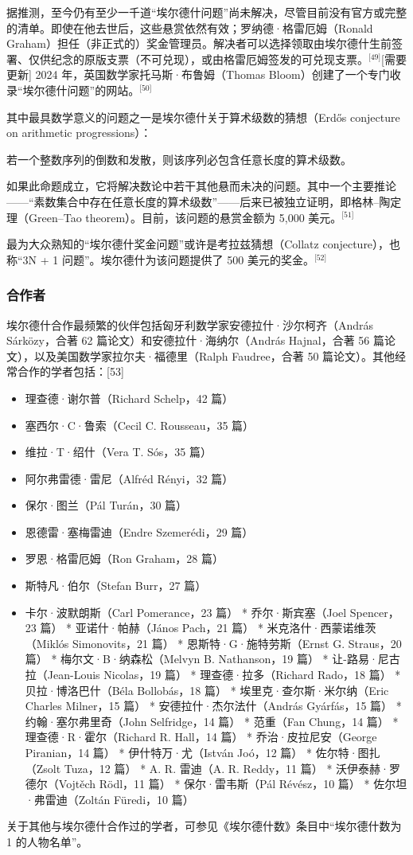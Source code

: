 据推测，至今仍有至少一千道“埃尔德什问题”尚未解决，尽管目前没有官方或完整的清单。即使在他去世后，这些悬赏依然有效；罗纳德·格雷厄姆（Ronald Graham）担任（非正式的）奖金管理员。解决者可以选择领取由埃尔德什生前签署、仅供纪念的原版支票（不可兑现），或由格雷厄姆签发的可兑现支票。\(^\text{[49]}\)[需要更新] 2024 年，英国数学家托马斯·布鲁姆（Thomas Bloom）创建了一个专门收录“埃尔德什问题”的网站。\(^\text{[50]}\)

其中最具数学意义的问题之一是埃尔德什关于算术级数的猜想（Erdős conjecture on arithmetic progressions）：

若一个整数序列的倒数和发散，则该序列必包含任意长度的算术级数。

如果此命题成立，它将解决数论中若干其他悬而未决的问题。其中一个主要推论——“素数集合中存在任意长度的算术级数”——后来已被独立证明，即格林–陶定理（Green–Tao theorem）。目前，该问题的悬赏金额为 5,000 美元。\(^\text{[51]}\)

最为大众熟知的“埃尔德什奖金问题”或许是考拉兹猜想（Collatz conjecture），也称“3N + 1 问题”。埃尔德什为该问题提供了 500 美元的奖金。\(^\text{[52]}\)
\subsubsection{合作者}
埃尔德什合作最频繁的伙伴包括匈牙利数学家安德拉什·沙尔柯齐（András Sárközy，合著 62 篇论文）和安德拉什·海纳尔（András Hajnal，合著 56 篇论文），以及美国数学家拉尔夫·福德里（Ralph Faudree，合著 50 篇论文）。其他经常合作的学者包括：[53]
\begin{itemize}
\item 理查德·谢尔普（Richard Schelp，42 篇）
\item 塞西尔·C·鲁索（Cecil C. Rousseau，35 篇）
\item 维拉·T·绍什（Vera T. Sós，35 篇）
\item 阿尔弗雷德·雷尼（Alfréd Rényi，32 篇）
\item 保尔·图兰（Pál Turán，30 篇）
\item 恩德雷·塞梅雷迪（Endre Szemerédi，29 篇）
\item 罗恩·格雷厄姆（Ron Graham，28 篇）
\item 斯特凡·伯尔（Stefan Burr，27 篇）
\item 卡尔·波默朗斯（Carl Pomerance，23 篇）
* 乔尔·斯宾塞（Joel Spencer，23 篇）
* 亚诺什·帕赫（János Pach，21 篇）
* 米克洛什·西蒙诺维茨（Miklós Simonovits，21 篇）
* 恩斯特·G·施特劳斯（Ernst G. Straus，20 篇）
* 梅尔文·B·纳森松（Melvyn B. Nathanson，19 篇）
* 让-路易·尼古拉（Jean-Louis Nicolas，19 篇）
* 理查德·拉多（Richard Rado，18 篇）
* 贝拉·博洛巴什（Béla Bollobás，18 篇）
* 埃里克·查尔斯·米尔纳（Eric Charles Milner，15 篇）
* 安德拉什·杰尔法什（András Gyárfás，15 篇）
* 约翰·塞尔弗里奇（John Selfridge，14 篇）
* 范重（Fan Chung，14 篇）
* 理查德·R·霍尔（Richard R. Hall，14 篇）
* 乔治·皮拉尼安（George Piranian，14 篇）
* 伊什特万·尤（István Joó，12 篇）
* 佐尔特·图扎（Zsolt Tuza，12 篇）
* A. R. 雷迪（A. R. Reddy，11 篇）
* 沃伊泰赫·罗德尔（Vojtěch Rödl，11 篇）
* 保尔·雷韦斯（Pál Révész，10 篇）
* 佐尔坦·弗雷迪（Zoltán Füredi，10 篇）
\end{itemize}

关于其他与埃尔德什合作过的学者，可参见《埃尔德什数》条目中“埃尔德什数为 1 的人物名单”。
